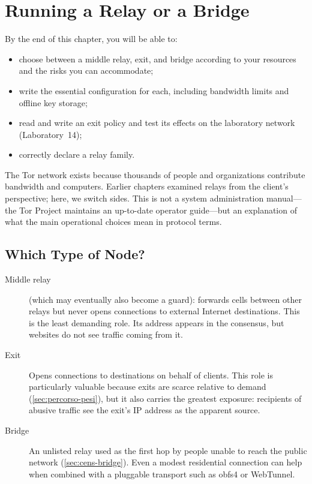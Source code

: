 \chapter{Running a Relay or a Bridge}\label{cap:22-relay}

\begin{obiettivi}
By the end of this chapter, you will be able to:
\begin{itemize}[nosep]
  \item choose between a middle relay, exit, and bridge according to your resources and the risks you can accommodate;
  \item write the essential configuration for each, including bandwidth limits and offline key storage;
  \item read and write an exit policy and test its effects on the laboratory network (Laboratory~14);
  \item correctly declare a relay family.
\end{itemize}
\end{obiettivi}

The Tor network exists because thousands of people and organizations contribute bandwidth and computers. Earlier chapters examined relays from the client's perspective; here, we switch sides. This is not a system administration manual---the Tor Project maintains an up-to-date operator guide---but an explanation of what the main operational choices mean in protocol terms.

\section{Which Type of Node?}\label{sec:relay-tipi}

\begin{description}
  \item[Middle relay] (which may eventually also become a guard): forwards cells between other relays but never opens connections to external Internet destinations. This is the least demanding role. Its address appears in the consensus, but websites do not see traffic coming from it.
  \item[Exit] Opens connections to destinations on behalf of clients. This role is particularly valuable because exits are scarce relative to demand (\cref{sec:percorso-pesi}), but it also carries the greatest exposure: recipients of abusive traffic see the exit's IP address as the apparent source.
  \item[Bridge] An unlisted relay used as the first hop by people unable to reach the public network (\cref{sec:cens-bridge}). Even a modest residential connection can help when combined with a pluggable transport such as obfs4 or WebTunnel.
\end{description}

